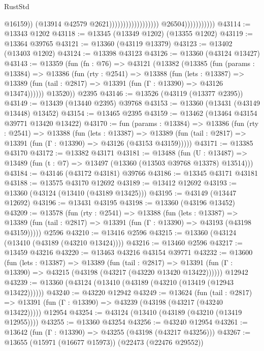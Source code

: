 \begin{lexlean}{RustStd}
\begin{coremodule}
                                                                @16159))
                                                            (@13914 @42579 @2621))))))))))))))))))
                          @26504)))))))))))
@43114 := @13343 @1202
@43118 := @13345 (@13349 @1202) (@13355 @1202)
@43119 := @13364 @39765
@43121 := @13360 (@43119 @13379)
@43123 := @13402 (@13403 @1202)
@43124 := @13398 @43123
@43126 := @13360 (@43124 @13427)
@43143 := @13359
    (fun (fn : @76) =>
    @43121
      (@13382
        (@13385
          (fun (params : @13384) =>
          @13386
            (fun (rty : @2541) =>
            @13388
              (fun (lets : @13387) =>
              @13389 (fun (tail : @2817) => @13391 (fun (Γ : @13390) => @43126 @13474))))))
        @13520))
    @2395
@43146 := @13526 (@43119 (@13377 @2395))
@43149 := @13439 (@13440 @2395) @39768
@43153 := @13360 (@13431 (@43149 @13448) @13452)
@43154 := @13465 @2395
@43159 := @13462 (@13464 @43154 @39771 @13420 @13422)
@43170 := fun (params : @13384) =>
  @13386
    (fun (rty : @2541) =>
    @13388
      (fun (lets : @13387) =>
      @13389 (fun (tail : @2817) => @13391 (fun (Γ : @13390) => @43126 (@43153 @43159)))))
@43171 := @13385 @43170
@43172 := @13382 @43171
@43181 := @13488
    (fun (U : @13487) => @13489 (fun (t : @7) => @13497 (@13360 (@13503 @39768 @13378) @13514)))
@43184 := @43146 (@43172 @43181) @39766
@43186 := @13345 @43171 @43181
@43188 := @13575 @43170 @12692
@43189 := @13412 @12692
@43193 := @13360 (@43124 (@13410 (@43189 @13425)))
@43195 := @43149 (@13447 @12692)
@43196 := @13431 @43195
@43198 := @13360 (@43196 @13452)
@43209 := @13578
    (fun (rty : @2541) =>
    @13388
      (fun (lets : @13387) =>
      @13389 (fun (tail : @2817) => @13391 (fun (Γ : @13390) => @43193 (@43198 @43159)))))
    @2596
@43210 := @13416 @2596
@43215 := @13360 (@43124 (@13410 (@43189 (@43210 @13424))))
@43216 := @13460 @2596
@43217 := @13459 @43216
@43220 := @13463 @43216 @43154 @39771
@43232 := @13600
    (fun (lets : @13387) =>
    @13389
      (fun (tail : @2817) =>
      @13391 (fun (Γ : @13390) => @43215 (@43198 (@43217 (@43220 @13420 @13422))))))
    @12942
@43239 := @13360 (@43124 (@13410 (@43189 (@43210 (@13419 (@12943 @13422))))))
@43240 := @43220 @12942
@43249 := @13624
    (fun (tail : @2817) => @13391 (fun (Γ : @13390) => @43239 (@43198 (@43217 (@43240 @13422)))))
    @12954
@43254 := @43124 (@13410 (@43189 (@43210 (@13419 @12955))))
@43255 := @13360 @43254
@43256 := @43240 @12954
@43261 := @13642 (fun (Γ : @13390) => @43255 (@43198 (@43217 @43256)))
@43267 := @13655 (@15971 (@16677 @15973)) (@22473 (@22476 @29552))

\end{coremodule}
\end{lexlean}
